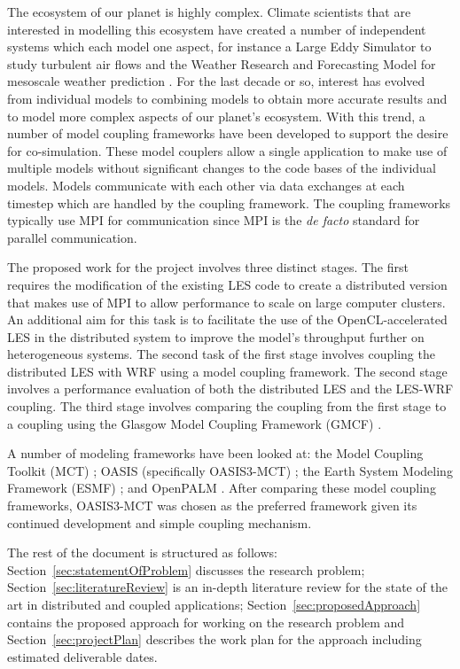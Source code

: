 The ecosystem of our planet is highly complex. Climate scientists that are
interested in modelling this ecosystem have created a number of independent
systems which each model one aspect, for instance a Large Eddy Simulator to
study turbulent air flows \cite{Nakayama2011,Nakayama2012} and the Weather
Research and Forecasting Model for mesoscale weather prediction
\cite{Michalakes2000}. For the last decade or so, interest has evolved from
individual models to combining models \cite{Michalakes2010} to obtain more
accurate results and to model more complex aspects of our planet's ecosystem.
With this trend, a number of model coupling frameworks have been developed to
support the desire for co-simulation. These model couplers allow a single
application to make use of multiple models without significant changes to the
code bases of the individual models. Models communicate with each other via data
exchanges at each timestep which are handled by the coupling framework. The
coupling frameworks typically use MPI for communication since MPI is the
\textit{de facto} standard for parallel communication.

The proposed work for the project involves three distinct stages. The first
requires the modification of the existing LES code to create a distributed
version that makes use of MPI to allow performance to scale on large computer
clusters. An additional aim for this task is to facilitate the use of the
OpenCL-accelerated LES \cite{Vanderbauwhede2014} in the distributed system to
improve the model's throughput further on heterogeneous systems. The second task
of the first stage involves coupling the distributed LES with WRF using a model
coupling framework. The second stage involves a performance evaluation of both
the distributed LES and the LES-WRF coupling. The third stage involves comparing
the coupling from the first stage to a coupling using the Glasgow Model Coupling
Framework (GMCF) \cite{Vanderbauwhede2014}.

A number of modeling frameworks have been looked at: the Model Coupling Toolkit
(MCT) \cite{Larson2005,Jacob2005}; OASIS (specifically OASIS3-MCT)
\cite{Valcke,Valcke2013}; the Earth System Modeling Framework (ESMF)
\cite{Ramework2004}; and OpenPALM \cite{Piacentini2011}. After comparing these
model coupling frameworks, OASIS3-MCT was chosen as the preferred framework
given its continued development and simple coupling mechanism.

The rest of the document is structured as follows:
Section~\ref{sec:statementOfProblem} discusses the research problem;
Section~\ref{sec:literatureReview} is an in-depth literature review for the
state of the art in distributed and coupled applications;
Section~\ref{sec:proposedApproach} contains the proposed approach for working on
the research problem and Section~\ref{sec:projectPlan} describes the work plan
for the approach including estimated deliverable dates.
